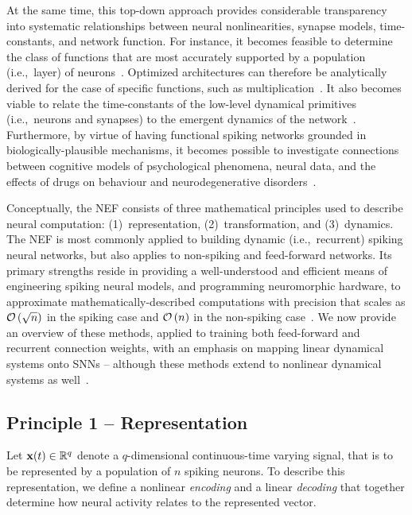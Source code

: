 At the same time, this top-down approach provides considerable transparency into systematic relationships between neural nonlinearities, synapse models, time-constants, and network function.
For instance, it becomes feasible to determine the class of functions that are most accurately supported by a population (i.e.,~layer) of neurons~\citep[][Chapter 7]{eliasmith2003a}.
Optimized architectures can therefore be analytically derived for the case of specific functions, such as multiplication~\citep{jgosmann2015}.
It also becomes viable to relate the time-constants of the low-level dynamical primitives (i.e.,~neurons and synapses) to the emergent dynamics of the network~\citep{voelker2018}.
Furthermore, by virtue of having functional spiking networks grounded in biologically-plausible mechanisms, it becomes possible to investigate connections between cognitive models of psychological phenomena, neural data, and the effects of drugs on behaviour and neurodegenerative disorders~\citep{eliasmith2013build, eliasmith2016biospaun, duggins2017b}.

Conceptually, the NEF consists of three mathematical principles used to describe neural computation: (1)~representation, (2)~transformation, and (3)~dynamics.
The NEF is most commonly applied to building dynamic (i.e.,~recurrent) spiking neural networks, but also applies to non-spiking and feed-forward networks.
Its primary strengths reside in providing a well-understood and efficient means of engineering spiking neural models, and programming neuromorphic hardware, to approximate mathematically-described computations with precision that scales as $\mathcal{O}\left({\sqrt{n}}\right)$ in the spiking case and $\mathcal{O}\left({n}\right)$ in the non-spiking case~\citep{eliasmith2003a, boahen2017neuromorph}.
We now provide an overview of these methods, applied to training both feed-forward and recurrent connection weights, with an emphasis on mapping linear dynamical systems onto SNNs -- although these methods extend to nonlinear dynamical systems as well~\citep{voelker2017iscas, voelker2017neuromorphic}.

\subsection{Principle 1 -- Representation}
\label{sec:principle1}

Let $\mathbf{x}(t) \in \mathbb{R}^q$ denote a $q$-dimensional continuous-time varying signal, that is to be represented by a population of $n$ spiking neurons.
To describe this representation, we define a nonlinear \emph{encoding} and a linear \emph{decoding} that together determine how neural activity relates to the represented vector.

